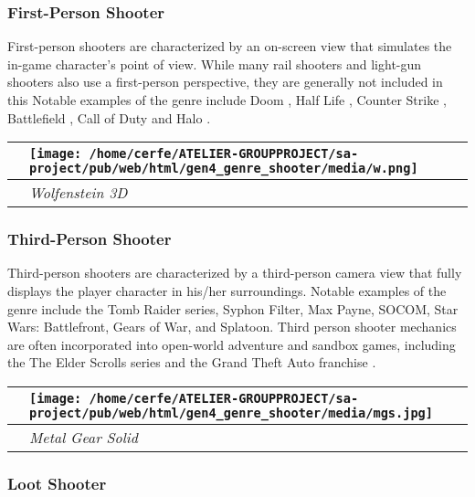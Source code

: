 \documentclass[a4paper,10pt]{book}
\begin{document}
 \subsubsection{First-Person Shooter }
 
            First-person shooters are characterized by an on-screen view that simulates the in-game character's point of view. While many rail shooters and light-gun shooters also use a first-person perspective, they are generally not included in this  
            Notable examples of the genre include  Doom , 
             Half Life , 
             Counter Strike , 
             Battlefield , 
             Call of Duty  and 
             Halo .
         
 \begin{longtable}{p{1mm}|l|}\hline
 
 & \texttt{[image: /home/cerfe/ATELIER-GROUPPROJECT/sa-project/pub/web/html/gen4\_genre\_shooter/media/w.png]}
 \\\hline
 
 & \textit{Wolfenstein 3D }
 \\\hline
 \end{longtable}
 
 \subsubsection{Third-Person Shooter }
 
            Third-person shooters are characterized by a third-person camera view that fully displays the player character in his/her surroundings.  
            Notable examples of the genre include the Tomb Raider series, Syphon Filter, Max Payne, SOCOM, Star Wars: Battlefront, Gears of War, and Splatoon.  
            Third person shooter mechanics are often incorporated into open-world adventure and sandbox games, including the  The Elder Scrolls series  and the  Grand Theft Auto franchise  .
           
 \begin{longtable}{p{1mm}|l|}\hline
 
 & \texttt{[image: /home/cerfe/ATELIER-GROUPPROJECT/sa-project/pub/web/html/gen4\_genre\_shooter/media/mgs.jpg]}
 \\\hline
 
 & \textit{Metal Gear Solid }
 \\\hline
 \end{longtable}
 
 \subsubsection{Loot Shooter }
 
\end{document}
